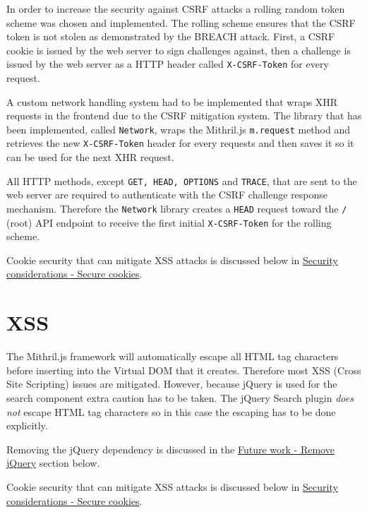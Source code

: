 \documentclass[12pt,a4paper]{report}
\begin{document}
In order to increase the security against CSRF attacks a rolling random token scheme was chosen and implemented. The rolling scheme ensures that the CSRF token is not stolen as demonstrated by the BREACH attack\cite{breach}. First, a CSRF cookie is issued by the web server to sign challenges against, then a challenge is issued by the web server as a HTTP header called \texttt{X-CSRF-Token} for every request.

A custom network handling system had to be implemented that wraps XHR requests in the frontend due to the CSRF mitigation system.  The library that has been implemented, called \texttt{Network}\cite{roaster-network}, wraps the Mithril.js \texttt{m.request} method and retrieves the new \texttt{X-CSRF-Token} header for every requests and then saves it so it can be used for the next XHR request.

All HTTP methods, except \texttt{GET, HEAD, OPTIONS} and \texttt{TRACE}, that are sent to the web server are required to authenticate with the CSRF challenge response mechanism. Therefore the \texttt{Network} library creates a \texttt{HEAD} request toward the \texttt{/} (root) API endpoint to receive the first initial \texttt{X-CSRF-Token} for the rolling scheme.

Cookie security that can mitigate XSS attacks is discussed below in \hyperref[subsec:secure-cookies]{Security considerations - Secure cookies}.

\section{XSS}
The Mithril.js framework will automatically escape all HTML tag characters before inserting into the Virtual DOM that it creates\cite{mithril-trust}. Therefore most XSS (Cross Site Scripting) issues are mitigated. However, because jQuery is used for the search component extra caution has to be taken. The jQuery Search plugin \textit{does not} escape HTML tag characters so in this case the escaping has to be done explicitly.

Removing the jQuery dependency is discussed in the \hyperref[subsec:remove-jquery]{Future work - Remove jQuery} section below.

Cookie security that can mitigate XSS attacks is discussed below in \hyperref[subsec:secure-cookies]{Security considerations - Secure cookies}.
\end{document}
